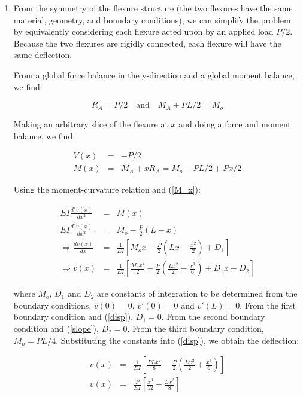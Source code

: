 \documentclass[11pt]{article}
\begin{document}
\begin{enumerate}

\item
From the symmetry of the flexure structure (the two flexures
have the same material, geometry, and boundary conditions), we can
simplify the problem by equivalently considering each flexure acted
upon by an applied load $P/2$.  Because the two flexures are rigidly
connected, each flexure will have the same deflection.

From a global force balance in the y-direction and a global moment
balance, we find:

$$ R_A=P/2 \quad \text{and} \quad  M_A+PL/2=M_o $$

Making an arbitrary slice of the flexure at $x$ and doing a force
and moment balance, we find:

\begin{eqnarray}
V(x) &=& -P/2 \nonumber \\
M(x) &=& M_A + xR_A = M_o - PL/2 + Px/2 \label{M_x}
\end{eqnarray}

Using the moment-curvature relation and (\ref{M_x}):

\begin{eqnarray}
EI\frac{d^2v(x)}{dx^2}&=&M(x) \nonumber \\
EI\frac{d^2v(x)}{dx^2}&=& M_o - \frac{P}{2}(L-x) \nonumber \\
\Rightarrow \frac{dv(x)}{dx} &=& \frac{1}{EI}\left[M_ox-\frac{P}{2}\left(Lx-\frac{x^2}{2}\right)+D_1\right] \label{slope}\\
\Rightarrow v(x) &=&
\frac{1}{EI}\left[\frac{M_ox^2}{2}-\frac{P}{2}\left(\frac{Lx^2}{2}-\frac{x^3}{6}\right)+D_1x+D_2\right]
\label{disp}
\end{eqnarray}

where $M_o$, $D_1$ and $D_2$ are constants of integration to be
determined from the boundary conditions, $v(0)=0$, $v'(0)=0$ and
$v'(L)=0$.  From the first boundary condition and (\ref{disp}),
$D_1=0$.  From the second boundary condition and (\ref{slope}),
$D_2=0$.  From the third boundary condition, $M_o=PL/4$.
Substituting the constants into (\ref{disp}), we obtain the
deflection:

\begin{eqnarray}
v(x) &=& \frac{1}{EI}\left[\frac{PLx^2}{8}-\frac{P}{2}\left(\frac{Lx^2}{2}+\frac{x^3}{6}\right)\right] \\
v(x) &=& \frac{P}{EI}\left[\frac{x^3}{12}-\frac{Lx^2}{8}\right]
\label{defl}
\end{eqnarray}


\end{enumerate}
\end{document}
